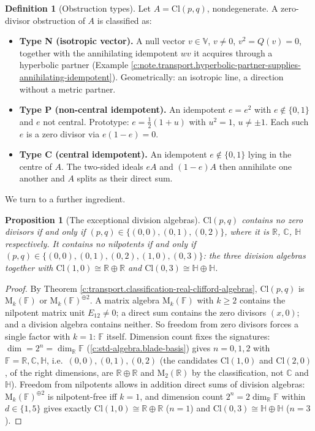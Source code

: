 \documentclass[11pt]{article}
\newtheorem{proposition}[theorem]{Proposition}
\theoremstyle{definition}
\newtheorem{definition}[theorem]{Definition}
\theoremstyle{plain}
\providecommand{\C}{}\renewcommand{\C}{\mathbb{C}}
\providecommand{\Cl}{}\renewcommand{\Cl}{\mathrm{Cl}}
\providecommand{\HH}{}\renewcommand{\HH}{\mathbb{H}}
\providecommand{\Mat}{}\renewcommand{\Mat}{\mathrm{M}}
\providecommand{\R}{}\renewcommand{\R}{\mathbb{R}}
\begin{document}
\begin{definition}[Obstruction types]\label{c:obj.transport.obstruction-types}
Let $A = \Cl(p,q)$, nondegenerate. A zero-divisor obstruction of $A$ is classified as:
\begin{itemize}
\item \textbf{Type N (isotropic vector).} A null vector $v \in \mathbb{V}$, $v \neq 0$, $v^2 = Q(v) = 0$, together with the annihilating idempotent $wv$ it acquires through a hyperbolic partner (Example \ref{c:note.transport.hyperbolic-partner-supplies-annihilating-idempotent}). Geometrically: an isotropic line, a direction without a metric partner.
\item \textbf{Type P (non-central idempotent).} An idempotent $e = e^2$ with $e \notin \{0, 1\}$ and $e$ not central. Prototype: $e = \tfrac12(1 + u)$ with $u^2 = 1$, $u \neq \pm 1$. Each such $e$ is a zero divisor via $e(1 - e) = 0$.
\item \textbf{Type C (central idempotent).} An idempotent $e \notin \{0,1\}$ lying in the centre of $A$. The two-sided ideals $eA$ and $(1-e)A$ then annihilate one another and $A$ splits as their direct sum.
\end{itemize}
\end{definition}

We turn to a further ingredient.

\begin{proposition}[The exceptional division algebras]\label{c:transport.exceptional-division-algebras}
$\Cl(p,q)$ contains no zero divisors if and only if $(p,q) \in \{(0,0), (0,1), (0,2)\}$, where it is $\R$, $\C$, $\HH$ respectively. It contains no nilpotents if and only if $(p,q) \in \{(0,0), (0,1), (0,2), (1,0), (0,3)\}$: the three division algebras together with $\Cl(1,0) \cong \R \oplus \R$ and $\Cl(0,3) \cong \HH \oplus \HH$.
\end{proposition}
\begin{proof}
By Theorem \ref{c:transport.classification-real-clifford-algebras}, $\Cl(p,q)$ is $\Mat_k(\mathbb{F})$ or $\Mat_k(\mathbb{F})^{\oplus 2}$. A matrix algebra $\Mat_k(\mathbb{F})$ with $k \geq 2$ contains the nilpotent matrix unit $E_{12} \neq 0$; a direct sum contains the zero divisors $(x, 0)$; and a division algebra contains neither. So freedom from zero divisors forces a single factor with $k = 1$: $\mathbb{F}$ itself. Dimension count fixes the signatures: $\dim = 2^n = \dim_\R \mathbb{F}$ (\ref{c:std-algebra.blade-basis}) gives $n = 0, 1, 2$ with $\mathbb{F} = \R, \C, \HH$, i.e.\ $(0,0), (0,1), (0,2)$ (the candidates $\Cl(1,0)$ and $\Cl(2,0)$, of the right dimensions, are $\R \oplus \R$ and $\Mat_2(\R)$ by the classification, not $\C$ and $\HH$). Freedom from nilpotents allows in addition direct sums of division algebras: $\Mat_k(\mathbb{F})^{\oplus 2}$ is nilpotent-free iff $k = 1$, and dimension count $2^n = 2\dim_\R \mathbb{F}$ within $d \in \{1,5\}$ gives exactly $\Cl(1,0) \cong \R \oplus \R$ ($n=1$) and $\Cl(0,3) \cong \HH \oplus \HH$ ($n=3$).

\end{proof}
\end{document}
